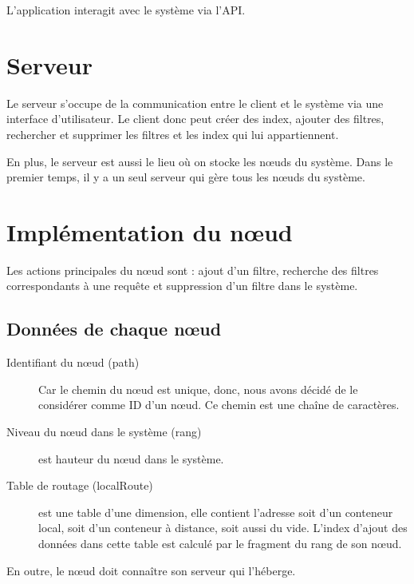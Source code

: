 \documentclass[a4paper,11pt]{report}
\begin{document}
	L'application interagit avec le système via l'API.
	
\section{Serveur}
	Le serveur s'occupe de la communication entre le client et le système via une interface d'utilisateur. Le client donc peut créer des index, ajouter des filtres, rechercher et supprimer les filtres et les index qui lui appartiennent.
	
	En plus, le serveur est aussi le lieu où on stocke les nœuds du système. Dans le premier temps, il y a un seul serveur qui gère tous les nœuds du système.
	
\section{Implémentation du nœud}
	Les actions principales du nœud sont : ajout d'un filtre, recherche des filtres correspondants à une requête et suppression d'un filtre dans le système.
\subsection{Données de chaque nœud}
	\begin{description}
		\item[Identifiant du nœud (path)] Car le chemin du nœud est unique, donc, nous avons décidé de le considérer comme ID d'un nœud. Ce chemin est une chaîne de caractères.
		\item[Niveau du nœud dans le système (rang)] est hauteur du nœud dans le système.
		\item[Table de routage (localRoute)] est une table d'une dimension, elle contient l'adresse soit d'un conteneur local, soit d'un conteneur à distance, soit aussi du vide. L'index d'ajout des données dans cette table est calculé par le fragment du rang de son nœud.
	\end{description}
	
	En outre, le nœud doit connaître son serveur qui l'héberge.
\end{document}
